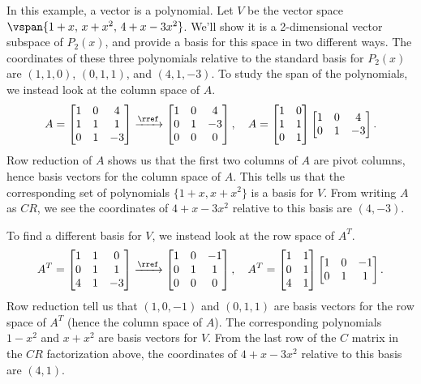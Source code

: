 \begin{example}
In this example, a vector is a polynomial.  Let $V$ be the vector space $\vspan\{1+x,\,x+x^2,\, 4+x-3x^2\}$. We'll show it is a 2-dimensional vector subspace of $P_2(x)$, and provide a basis for this space in two different ways. The coordinates of these three polynomials relative to the standard basis for $P_2(x)$ are $(1,1,0)$, $(0,1,1)$, and $(4,1,-3)$. 
To study the span of the polynomials, we instead look at the column space of $A$.
$$
A=
\begin{bmatrix}
 1 & 0 & 4\\
 1 & 1 & 1\\
 0 & 1 & -3
\end{bmatrix} 
\xrightarrow{\rref}
\begin{bmatrix}
 1 & 0 & 4\\
 0 & 1 & -3\\
 0 & 0 & 0
\end{bmatrix}, \quad A=\begin{bmatrix}1&0\\1&1\\0&1\end{bmatrix}
\begin{bmatrix}1&0&4\\0&1&-3\end{bmatrix}.$$ Row reduction of $A$ shows us that the first two columns of $A$ are pivot columns, hence basis vectors for the column space of $A$.  This tells us that the corresponding set of polynomials $\{1+x, x+x^2\}$ is a basis for $V$.  From writing $A$ as $CR$, we see the coordinates of $4+x-3x^2$ relative to this basis are $(4,-3)$.

To find a different basis for $V$, we instead look at the row space of $A^T$.
$$A^T
=
\begin{bmatrix}
 1 & 1 & 0 \\
 0 & 1 & 1 \\
 4 & 1 & -3
\end{bmatrix}
\xrightarrow{\rref}
\begin{bmatrix}
 1 & 0 & -1 \\
 0 & 1 & 1 \\
 0 & 0 & 0
\end{bmatrix},\quad A^T=\begin{bmatrix}1&1\\0&1\\4&1\end{bmatrix}
\begin{bmatrix}1&0&-1\\0&1&1\end{bmatrix}.$$ 
Row reduction tell us that $(1,0,-1)$ and $(0,1,1)$ are basis vectors for the row space of $A^T$ (hence the column space of $A$).  The corresponding polynomials $1-x^2$ and $x+x^2$ are basis vectors for $V$. From the last row of the $C$ matrix in the $CR$ factorization above, the coordinates of $4+x-3x^2$ relative to this basis are $(4,1)$.
  
\end{example}

